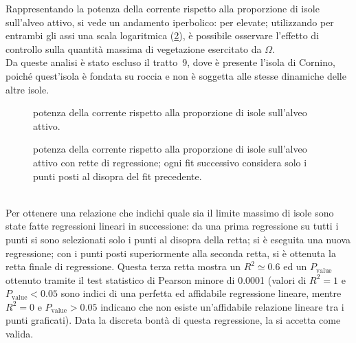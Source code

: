 Rappresentando la potenza della corrente rispetto alla proporzione di isole sull'alveo attivo, si vede un andamento iperbolico: per elevate; utilizzando per entrambi gli assi una scala logaritmica (\cref{graph:omega-area-percentuale}), è possibile osservare l'effetto di controllo sulla quantità massima di vegetazione esercitato da $\Omega$.
\\
Da queste analisi è stato escluso il tratto~9, dove è presente l'isola di Cornino, poiché quest'isola è fondata su roccia e non è soggetta alle stesse dinamiche delle altre isole.
%
\begin{figure}
	\centering
	
	\caption[potenza della corrente rispetto alla proporzione di isole sull'alveo attivo, grafico lineare]{potenza della corrente rispetto alla proporzione di isole sull'alveo attivo.}
	\label{graph:omega-area-percentuale-linear}
\end{figure}
%
\begin{figure}
	\centering
	
	\caption[potenza della corrente rispetto alla proporzione di isole sull'alveo attivo, grafico bilogaritmico]{potenza della corrente rispetto alla proporzione di isole sull'alveo attivo con rette di regressione; ogni fit successivo considera solo i punti posti al disopra del fit precedente.}
	\label{graph:omega-area-percentuale}
\end{figure}
%
%	
%
\\
Per ottenere una relazione che indichi quale sia il limite massimo di isole sono state fatte regressioni lineari in successione: da una prima regressione su tutti i punti si sono selezionati solo i punti al disopra della retta; si è eseguita una nuova regressione; con i punti posti superiormente alla seconda retta, si è ottenuta la retta finale di regressione.
Questa terza retta mostra un $R^2 \simeq 0.6$ ed un $P_\mathrm{value}$ ottenuto tramite il test statistico di Pearson minore di \num{0.0001} (valori di $R^2 = 1$ e $P_\mathrm{value} < 0.05$ sono indici di una perfetta ed affidabile regressione lineare, mentre $R^2 = 0$ e $P_\mathrm{value} > 0.05$ indicano che non esiste un'affidabile relazione lineare tra i punti graficati).
Data la discreta bontà di questa regressione, la si accetta come valida.


